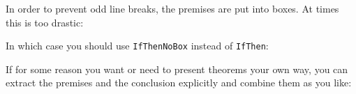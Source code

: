 \begin{isabellebody}
\begin{isamarkuptext}
In order to prevent odd line breaks, the premises are put into boxes.
At times this is too drastic:
\begin{theorem}
\end{theorem}
In which case you should use \texttt{IfThenNoBox} instead of
\texttt{IfThen}:
\begin{theorem}
\end{theorem}%
\end{isamarkuptext}%
\isamarkuptrue%
%
\isamarkuptrue%
%
\begin{isamarkuptext}%
If for some reason you want or need to present theorems your
own way, you can extract the premises and the conclusion explicitly
and combine them as you like:
\begin{itemize}

\end{itemize}
\end{isamarkuptext}
\end{isabellebody}
